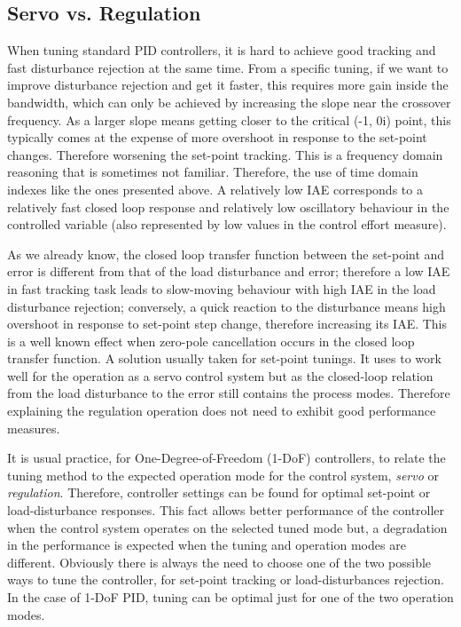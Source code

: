 \subsection{Servo vs. Regulation}

 When tuning standard PID controllers, it is hard to achieve good tracking and fast disturbance rejection at the same time. From a specific tuning, if we want to improve disturbance rejection and get it faster, this requires more gain inside the bandwidth, which can only be achieved by increasing the slope near the crossover frequency. As a larger slope means getting closer to the critical (-1, 0i) point, this typically comes at the expense of more overshoot in response to the set-point changes. Therefore worsening the set-point tracking. This is a frequency domain reasoning that is sometimes not familiar. Therefore, the use of time domain indexes like the ones presented above. A relatively low IAE corresponds to a relatively fast closed loop response and relatively low oscillatory behaviour in the controlled variable (also represented by low values in the control effort measure). 
 
 As we already know, the closed loop transfer function between the set-point and error is different from that of the load disturbance and error; therefore a low IAE in fast tracking task leads to slow-moving behaviour with high IAE in the load disturbance rejection; conversely, a quick reaction to the disturbance means high overshoot in response to set-point step change, therefore increasing its IAE. This is a well known effect when zero-pole cancellation occurs in the closed loop transfer function. A solution usually taken for set-point tunings. It uses to work well for the operation as a servo control system but as the closed-loop relation from the load disturbance to the error still contains the process modes. Therefore explaining the regulation operation does not need to exhibit good performance measures.
 
It is usual practice, for One-Degree-of-Freedom (1-DoF) controllers, to relate the tuning method to the expected operation mode for the control system, \emph{servo} or \emph{regulation}. Therefore, controller settings can be found for optimal set-point or load-disturbance responses. This fact allows better performance of the controller when the control system operates on the selected tuned mode but, a degradation in the performance is expected when the tuning and operation modes are different. Obviously there is always the need to choose one of the two possible ways to tune the controller, for set-point tracking or load-disturbances rejection. In the case of 1-DoF PID, tuning can be optimal just for one of the two operation modes.

